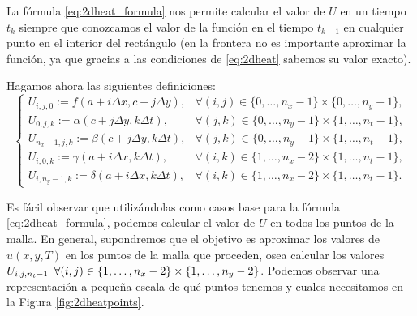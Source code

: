 La fórmula \eqref{eq:2dheat_formula} nos permite calcular el valor de $U$ en un tiempo $t_k$ siempre que conozcamos el valor de la función en el tiempo $t_{k-1}$ en cualquier punto en el interior del rectángulo (en la frontera no es importante aproximar la función, ya que gracias a las condiciones de \eqref{eq:2dheat} sabemos su valor exacto).

Hagamos ahora las siguientes definiciones:
\begin{equation}
	\begin{cases}
		U_{i,j,0}:= f(a+i\Delta x,c+j\Delta y), & \forall (i,j) \in \{0,\dots,n_x-1\} \times \{0, \dots, n_y-1\}, \\
		U_{0,j,k}:=\alpha(c+j\Delta y,k\Delta t), & \forall (j,k) \in \{0,\dots, n_y-1\}\times \{1,\dots, n_t-1\}, \\
		U_{n_x-1,j,k}:= \beta(c+j\Delta y,k\Delta t), & \forall (j,k) \in \{0,\dots, n_y-1\}\times \{1,\dots, n_t-1\}, \\
		U_{i,0,k}:= \gamma(a+i\Delta x,k\Delta t), & \forall (i,k) \in \{1, \dots, n_x-2\} \times \{1, \dots, n_t-1\}, \\
		U_{i,n_y-1,k}:= \delta(a+i\Delta x,k\Delta t), & \forall (i,k) \in \{1, \dots, n_x-2\} \times \{1, \dots, n_t-1\}.
	\end{cases}
\end{equation}

Es fácil observar que utilizándolas como casos base para la fórmula \eqref{eq:2dheat_formula}, podemos calcular el valor de $U$ en todos los puntos de la malla. En general, supondremos que el objetivo es aproximar los valores de $u(x,y,T)$ en los puntos de la malla que proceden, osea calcular los valores $U_{i,j,n_t-1} \hspace{5px} \forall (i,j)\in\{1,\dots,n_x-2\} \times \{1,\dots, n_y-2\}$. Podemos observar una representación a pequeña escala de qué puntos tenemos y cuales necesitamos en la Figura \ref{fig:2dheatpoints}.

